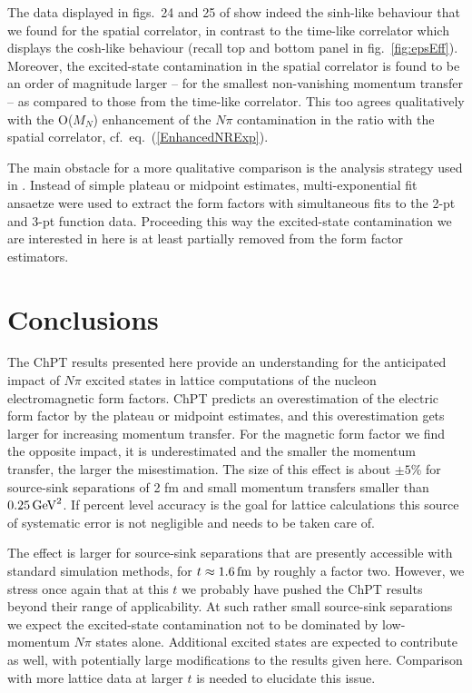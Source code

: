 \documentclass[11pt,prd,aps,showpacs,eqsecnum,floatfix,nofootinbib,preprint,tightenlines]{revtex4}
\newcommand{\pref}[1]{(\ref{#1})}
\begin{document}
The data displayed in figs.\ 24 and 25 of \cite{Jang:2019jkn} show indeed the sinh-like behaviour that we found for the spatial correlator, in contrast to the time-like correlator which displays the cosh-like behaviour (recall top and bottom panel in fig.\ \ref{fig:epsEff}). Moreover, the excited-state contamination in the spatial correlator is found to be an order of magnitude larger -- for the smallest non-vanishing momentum transfer -- as compared to those from the time-like correlator. This too agrees qualitatively with the O($M_N$) enhancement of the $N\pi$ contamination in the ratio with the spatial correlator, cf.\ eq.\ \pref{EnhancedNRExp}.

The main obstacle for a more qualitative comparison is the analysis strategy used in \cite{Jang:2019jkn}. Instead of simple plateau or midpoint estimates, multi-exponential fit ansaetze were used to extract the form factors with simultaneous fits to the 2-pt and 3-pt function data. Proceeding this way the excited-state contamination we are interested in here  is at least partially removed from the form factor estimators. 

\section{Conclusions}

The ChPT results presented here provide an understanding for the anticipated impact of $N\pi$ excited states in lattice computations of the nucleon electromagnetic form factors. ChPT predicts an overestimation of the electric form factor by the plateau or midpoint estimates, and this overestimation gets larger for increasing momentum transfer. For the magnetic form factor we find the opposite impact, it is underestimated and the smaller the momentum transfer, the larger the misestimation. The size of this effect is about $\pm 5$\% for source-sink separations of 2 fm and small momentum transfers smaller than $0.25\,{\rm GeV}^2$. If percent level accuracy is the goal for lattice calculations this source of systematic error is not negligible and needs to be taken care of.

The effect is larger for source-sink separations that are presently accessible with standard simulation methods, for $t\approx1.6\,{\rm fm}$ by roughly a factor two. However, we stress once again that at this $t$ we probably have pushed the ChPT results beyond their range of applicability. At such rather small source-sink separations we expect the excited-state contamination not to be dominated by low-momentum $N\pi$ states alone. Additional excited states are expected to contribute as well, with potentially large modifications to the results given here. Comparison with more lattice data at larger $t$ is needed to elucidate this issue.
\end{document}
